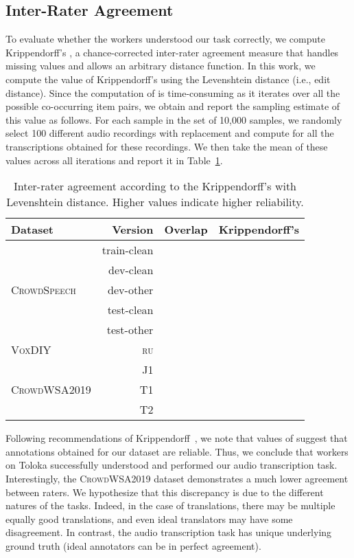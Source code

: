 \documentclass{article}
\newcommand{\speech}{\textsc{CrowdSpeech}}
\newcommand{\vox}{\textsc{VoxDIY}}
\newcommand{\crowd}{\textsc{CrowdWSA2019}}
\begin{document}
\subsection{Inter-Rater Agreement}

To evaluate whether the workers understood our task correctly, we compute Krippendorff's  \citep{Krippendorff:18}, a chance-corrected inter-rater agreement measure that handles missing values and allows an arbitrary distance function. In this work, we compute the value of Krippendorff's  using the Levenshtein distance (i.e., edit distance). Since the computation of  is time-consuming as it iterates over all the possible co-occurring item pairs, we obtain and report the sampling estimate of this value as follows. For each sample in the set of 10,000 samples, we randomly select 100 different audio recordings with replacement and compute  for all the transcriptions obtained for these recordings. We then take the mean of these values across all iterations and report it in Table~\ref{tab:alpha}.

\begin{table}[t]
  \caption{Inter-rater agreement according to the Krippendorff's  with Levenshtein distance. Higher values indicate higher reliability.}
  \centering
  \begin{tabular}{lrrr}\toprule
  \textbf{Dataset} & \textbf{Version} & \textbf{Overlap} & \textbf{Krippendorff's}   \\\midrule
  \multirow{5}{*}{\speech} & train-clean &  &   \\
   & dev-clean &  &   \\
   & dev-other &  &   \\
   & test-clean &  &   \\
   & test-other &  &  \\
  \midrule
  {\vox} & \textsc{ru} &  &   \\\midrule
  \multirow{3}{*}{\crowd} & J1 &  &  \\
   & T1 &  &   \\
   & T2 &  &   \\\bottomrule
  \end{tabular}
  \label{tab:alpha}
\end{table}

Following recommendations of Krippendorff~\citep{Krippendorff:18}, we note that values of  suggest that annotations obtained for our dataset are reliable. Thus, we conclude that workers on Toloka successfully understood and performed our audio transcription task. Interestingly, the \crowd{} dataset demonstrates a much lower agreement between raters. We hypothesize that this discrepancy is due to the different natures of the tasks. Indeed, in the case of translations, there may be multiple equally good translations, and even ideal translators may have some disagreement. In contrast, the audio transcription task has unique underlying ground truth (ideal annotators can be in perfect agreement).
\end{document}
